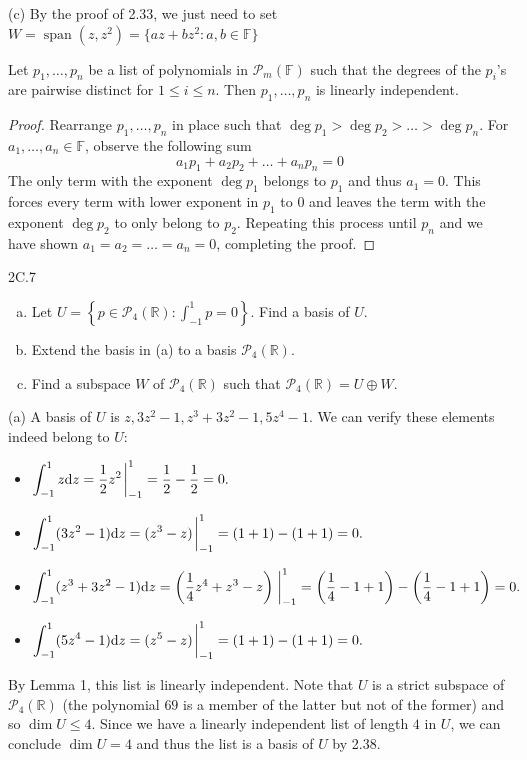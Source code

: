 \documentclass{exam}
\newcommand{\paren}[1]{\left(#1\right)}
\newcommand{\curly}[1]{\left\{#1\right\}}
\DeclareMathOperator{\spn}{span}
\begin{document}
(c) By the proof of 2.33, we just need to set $W = \spn(z, z^2) = \{az + bz^2 : a, b\in\mathbb F\}$

\begin{lemma}{1}
    Let $p_1, \dots, p_n$ be a list of polynomials in $\mathcal{P}_m(\mathbb F)$ such that the degrees of the $p_i$'s are pairwise distinct for $1 \le i \le n$. Then $p_1, \dots, p_n$ is linearly independent.
\end{lemma}

\begin{proof}
    Rearrange $p_1, \dots, p_n$ in place such that $\deg p_1 > \deg p_2 >\dots>\deg p_n$. For $a_1, \dots, a_n\in\mathbb F$, observe the following sum \[
        a_1p_1 + a_2p_2 + \dots + a_np_n = 0
    \]
    The only term with the exponent $\deg p_1$ belongs to $p_1$ and thus $a_1 = 0$. This forces every term with lower exponent in $p_1$ to $0$ and leaves the term with the exponent $\deg p_2$ to only belong to $p_2$. Repeating this process until $p_n$ and we have shown $a_1 = a_2 = \dots = a_n = 0$, completing the proof.
\end{proof}

\begin{problem}{2C.7}
    \begin{enumerate}[(a)]
        \item Let $U = \curly{p\in\mathcal P_4(\mathbb R) : \int_{-1}^1 p = 0}$. Find a basis of $U$.
        \item Extend the basis in (a) to a basis $\mathcal P_4(\mathbb R)$.
        \item Find a subspace $W$ of $\mathcal P_4(\mathbb R)$ such that $\mathcal P_4(\mathbb R) = U\oplus W$.
    \end{enumerate}
\end{problem}

(a) A basis of $U$ is $z, 3z^2 - 1, z^3 + 3z^2 - 1, 5z^4 - 1$. We can verify these elements indeed belong to $U$:
\begin{itemize}
    \item $\displaystyle\int_{-1}^1z\dd z = \frac12z^2\eval_{-1}^1 = \frac12 - \frac12 = 0.$
    \item $\displaystyle\int_{-1}^1(3z^2 - 1)\dd z = (z^3 - z)\eval_{-1}^1 = (1 + 1) - (1 + 1) = 0.$
    \item $\displaystyle\int_{-1}^1(z^3+3z^2-1)\dd z = \paren{\frac14z^4 + z^3 - z}\eval_{-1}^1 = \paren{\frac14 - 1 + 1} - \paren{\frac14 - 1 + 1} = 0.$
    \item $\displaystyle\int_{-1}^1(5z^4 - 1)\dd z = (z^5 - z)\eval_{-1}^1 = (1 + 1) - (1 + 1) = 0.$
\end{itemize}
By Lemma 1, this list is linearly independent. Note that $U$ is a strict subspace of $\mathcal P_4(\mathbb R)$ (the polynomial $69$ is a member of the latter but not of the former) and so $\dim U \le 4$. Since we have a linearly independent list of length $4$ in $U$, we can conclude $\dim U = 4$ and thus the list is a basis of $U$ by 2.38.
\end{document}
